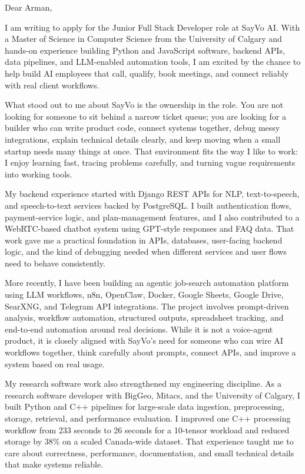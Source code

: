\documentclass[11pt]{letter}
\begin{document}
\begin{letter}{}

\opening{Dear Arman,}

I am writing to apply for the Junior Full Stack Developer role at SayVo AI. With a Master of Science in Computer Science from the University of Calgary and hands-on experience building Python and JavaScript software, backend APIs, data pipelines, and LLM-enabled automation tools, I am excited by the chance to help build AI employees that call, qualify, book meetings, and connect reliably with real client workflows.

What stood out to me about SayVo is the ownership in the role. You are not looking for someone to sit behind a narrow ticket queue; you are looking for a builder who can write product code, connect systems together, debug messy integrations, explain technical details clearly, and keep moving when a small startup needs many things at once. That environment fits the way I like to work: I enjoy learning fast, tracing problems carefully, and turning vague requirements into working tools.

My backend experience started with Django REST APIs for NLP, text-to-speech, and speech-to-text services backed by PostgreSQL. I built authentication flows, payment-service logic, and plan-management features, and I also contributed to a WebRTC-based chatbot system using GPT-style responses and FAQ data. That work gave me a practical foundation in APIs, databases, user-facing backend logic, and the kind of debugging needed when different services and user flows need to behave consistently.

More recently, I have been building an agentic job-search automation platform using LLM workflows, n8n, OpenClaw, Docker, Google Sheets, Google Drive, SearXNG, and Telegram API integrations. The project involves prompt-driven analysis, workflow automation, structured outputs, spreadsheet tracking, and end-to-end automation around real decisions. While it is not a voice-agent product, it is closely aligned with SayVo's need for someone who can wire AI workflows together, think carefully about prompts, connect APIs, and improve a system based on real usage.

My research software work also strengthened my engineering discipline. As a research software developer with BigGeo, Mitacs, and the University of Calgary, I built Python and C++ pipelines for large-scale data ingestion, preprocessing, storage, retrieval, and performance evaluation. I improved one C++ processing workflow from 233 seconds to 26 seconds for a 10-tensor workload and reduced storage by 38\% on a scaled Canada-wide dataset. That experience taught me to care about correctness, performance, documentation, and small technical details that make systems reliable.


\end{letter}
\end{document}
